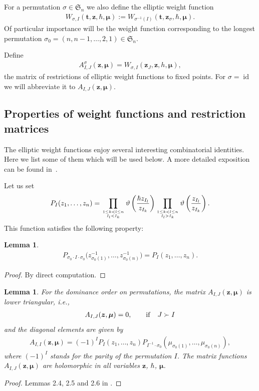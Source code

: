 \documentclass[pdftex]{sigma}
\DeclareMathOperator\id{id}
\def\ttt{{\boldsymbol t}}
\def\zz{{\boldsymbol z}}
\def\mub{{\boldsymbol\mu}}
\let\thi\vartheta
\numberwithin{equation}{section}
\newtheorem{Lemma}[Theorem]{Lemma}
\begin{document}
For a permutation $\sigma\in \mathfrak{S}_n$ we also define the elliptic weight function
\begin{gather*}
W_{\sigma,I}(\ttt,\zz,\hbar,\mub) :=W_{\sigma^{-1}(I)}(\ttt,\zz_{\sigma},\hbar,\mub).
\end{gather*}
Of particular importance will be the weight function corresponding to the longest permutation $\sigma_0=(n,n-1,\dots,2,1) \in \mathfrak{S}_n$.

Define
\begin{gather} \label{resmat}
A^{\sigma}_{I,J}(\zz,\mub) = W_{\sigma, I} (\zz_{J},\zz,h,\mub),
\end{gather}
the matrix of restrictions of elliptic weight functions to fixed points. For $\sigma=\id$ we will abbreviate it to $A_{I,J}(\zz,\mub)$.

\subsection{Properties of weight functions and restriction matrices}
The elliptic weight functions enjoy several interesting combinatorial identities. Here we list some of them which will be used below. A more detailed exposition can be found in~\cite{Rim,RTV}.

Let us set
\begin{gather*}
P_{I}(z_1,\dots,z_n)=\prod\limits_{{1\leq k <l\leq n}\atop {I_{l}<I_{k}}} \thi\left(\frac{\hbar z_{I_{l}}}{z_{I_{k}}}\right)
\prod\limits_{{1\leq k <l\leq n}\atop {I_{l}>I_{k}}} \thi\left(\frac{ z_{I_{l}}}{z_{I_{k}}}\right).
\end{gather*}
This function satisfies the following property:
\begin{Lemma} \label{pprop}
\begin{gather*}
P_{\sigma_0 \cdot I \cdot \sigma_{0}}\big(z^{-1}_{\sigma_{0}(1)},\dots, z^{-1}_{\sigma_{0}(n)}\big)=P_{I}(z_1,\dots,z_n).
\end{gather*}
\end{Lemma}
\begin{proof}By direct computation.
\end{proof}

\begin{Lemma} \label{hollem}For the dominance order on permutations, the matrix $A_{I,J}(\zz,\mub)$ is lower triangular, i.e.,
\begin{gather*}
A_{I,J}(\zz,\mub)=0, \qquad {\rm if} \quad J \succ I
\end{gather*}
and the diagonal elements are given by
\begin{gather} \label{diagonal}
A_{I,I}(\zz,\mub)=(-1)^{I} P_{I}(z_1,\dots,z_n) P_{I^{-1}\cdot \sigma_{0}} (\mu_{\sigma_{0}(1)},\dots,\mu_{\sigma_{0}(n)}),
\end{gather}
where $(-1)^{I}$ stands for the parity of the permutation $I$. The matrix functions $A_{I,J}(\zz,\mub)$ are holomorphic in all variables $\zz$, $\hbar$, $\mub$.
\end{Lemma}
\begin{proof}Lemmas 2.4, 2.5 and 2.6 in \cite{RTV}.
\end{proof}
\end{document}
